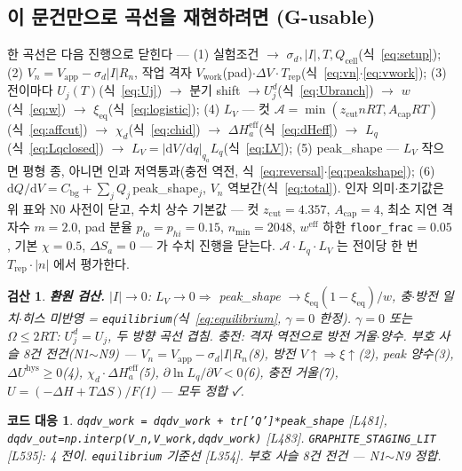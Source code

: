 \documentclass[11pt,a4paper]{article}
\newtheorem*{codebox}{코드 대응}
\newtheorem*{verifybox}{검산}
\newcommand{\dd}{\mathrm{d}}
\newcommand{\eff}{\mathrm{eff}}
\newcommand{\eq}{\mathrm{eq}}
\newcommand{\app}{\mathrm{app}}
\newcommand{\cell}{\mathrm{cell}}
\newcommand{\bg}{\mathrm{bg}}
\newcommand{\work}{\mathrm{work}}
\newcommand{\rep}{\mathrm{rep}}
\newcommand{\hys}{\mathrm{hys}}
\newcommand{\sgn}{\sigma_d}
\begin{document}
\subsection{이 문건만으로 곡선을 재현하려면 (G-usable)}
한 곡선은 다음 진행으로 닫힌다 — (1) 실험조건 $\to$ $\sgn,|I|,T,Q_\cell$(식~\eqref{eq:setup}); (2) $V_n=V_\app-\sgn|I|R_n$, 작업 격자 $V_\work$(pad)$\cdot\Delta V\cdot T_\rep$(식~\eqref{eq:vn}$\cdot$\eqref{eq:vwork}); (3) 전이마다 $U_j(T)$(식~\eqref{eq:Uj}) $\to$ 분기 shift $\to U_j^d$(식~\eqref{eq:Ubranch}) $\to$ $w$(식~\eqref{eq:w}) $\to$ $\xi_\eq$(식~\eqref{eq:logistic}); (4) $L_V$ — 컷 $\mathcal A=\min(z_{\mathrm{cut}}nRT,A_{\mathrm{cap}}RT)$(식~\eqref{eq:affcut}) $\to$ $\chi_d$(식~\eqref{eq:chid}) $\to$ $\Delta H_a^\eff$(식~\eqref{eq:dHeff}) $\to$ $L_q$(식~\eqref{eq:Lqclosed}) $\to$ $L_V=|\dd V/\dd q|_{q_a}L_q$(식~\eqref{eq:LV}); (5) peak\_shape — $L_V$ 작으면 평형 종, 아니면 인과 저역통과(충전 역전, 식~\eqref{eq:reversal}$\cdot$\eqref{eq:peakshape}); (6) $\dd Q/\dd V=C_\bg+\sum_jQ_j\,$peak\_shape$_j$, $V_n$ 역보간(식~\eqref{eq:total}). 인자 의미$\cdot$초기값은 위 표와 N0 사전이 닫고, 수치 상수 기본값 — 컷 $z_{\mathrm{cut}}=4.357$, $A_{\mathrm{cap}}=4$, 최소 지연 격자수 $m=2.0$, pad 분율 $p_{lo}=p_{hi}=0.15$, $n_{\min}=2048$, $w^\eff$ 하한 \texttt{floor\_frac}$=0.05$, 기본 $\chi=0.5$, $\Delta S_a=0$ — 가 수치 진행을 닫는다. $\mathcal A\cdot L_q\cdot L_V$ 는 전이당 한 번 $T_\rep\cdot|n|$ 에서 평가한다.

\begin{verifybox}
\textbf{환원 검산.} $|I|\to0$: $L_V\to0\Rightarrow$ peak\_shape $\to\xi_\eq(1-\xi_\eq)/w$, 충$\cdot$방전 일치$\cdot$히스 미반영 = \texttt{equilibrium}(식~\eqref{eq:equilibrium}, $\gamma=0$ 한정). $\gamma=0$ 또는 $\Omega\le2RT$: $U_j^d=U_j$, 두 방향 곡선 겹침. 충전: 격자 역전으로 방전 거울$\cdot$양수. 부호 사슬 8건 전건(N1$\sim$N9) — $V_n=V_\app-\sgn|I|R_n$(8), 방전 $V\!\uparrow\Rightarrow\xi\!\uparrow$(2), peak 양수(3), $\Delta U^\hys\ge0$(4), $\chi_d\cdot\Delta H_a^\eff$(5), $\partial\ln L_q/\partial V<0$(6), 충전 거울(7), $U=(-\Delta H+T\Delta S)/F$(1) — 모두 정합 ✓.
\end{verifybox}

\begin{codebox}
\texttt{dqdv\_work = dqdv\_work + tr['Q']*peak\_shape} [L481], \texttt{dqdv\_out=np.interp(V\_n,V\_work,dqdv\_work)} [L483]. \texttt{GRAPHITE\_STAGING\_LIT} [L535]: 4 전이. \texttt{equilibrium} 기준선 [L354]. 부호 사슬 8건 전건 — N1$\sim$N9 정합.
\end{codebox}
\end{document}

